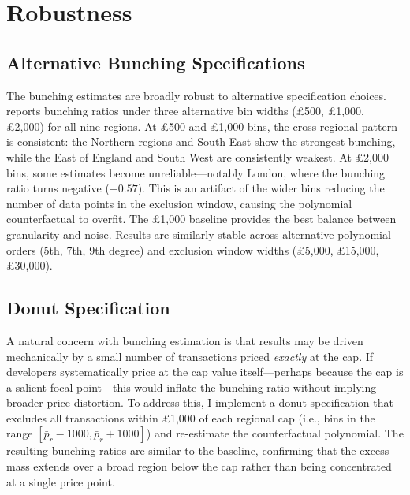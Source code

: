 \documentclass[12pt]{article}
\begin{document}
\section{Robustness}\label{sec:robustness}

\subsection{Alternative Bunching Specifications}

The bunching estimates are broadly robust to alternative specification choices.  reports bunching ratios under three alternative bin widths (\pounds500, \pounds1,000, \pounds2,000) for all nine regions. At \pounds500 and \pounds1,000 bins, the cross-regional pattern is consistent: the Northern regions and South East show the strongest bunching, while the East of England and South West are consistently weakest. At \pounds2,000 bins, some estimates become unreliable---notably London, where the bunching ratio turns negative ($-0.57$). This is an artifact of the wider bins reducing the number of data points in the exclusion window, causing the polynomial counterfactual to overfit. The \pounds1,000 baseline provides the best balance between granularity and noise. Results are similarly stable across alternative polynomial orders (5th, 7th, 9th degree) and exclusion window widths (\pounds5,000, \pounds15,000, \pounds30,000).



\subsection{Donut Specification}

A natural concern with bunching estimation is that results may be driven mechanically by a small number of transactions priced \textit{exactly} at the cap. If developers systematically price at the cap value itself---perhaps because the cap is a salient focal point---this would inflate the bunching ratio without implying broader price distortion. To address this, I implement a donut specification that excludes all transactions within \pounds1,000 of each regional cap (i.e., bins in the range $[\bar{p}_r - 1000, \bar{p}_r + 1000]$) and re-estimate the counterfactual polynomial. The resulting bunching ratios are similar to the baseline, confirming that the excess mass extends over a broad region below the cap rather than being concentrated at a single price point.
\end{document}
